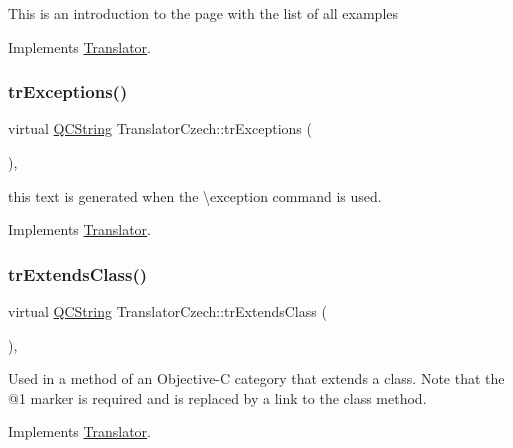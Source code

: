 This is an introduction to the page with the list of all examples 

Implements \mbox{\hyperlink{class_translator}{Translator}}.

\mbox{\label{class_translator_czech_af1f3a72b737a602f598d5bf13b7fa20d}} 
\subsubsection{\texorpdfstring{trExceptions()}{trExceptions()}}
{\footnotesize\ttfamily virtual \mbox{\hyperlink{class_q_c_string}{Q\+C\+String}} Translator\+Czech\+::tr\+Exceptions (\begin{DoxyParamCaption}{ }\end{DoxyParamCaption})\hspace{0.3cm}{\ttfamily [inline]}, {\ttfamily [virtual]}}

this text is generated when the \textbackslash{}exception command is used. 

Implements \mbox{\hyperlink{class_translator}{Translator}}.

\mbox{\label{class_translator_czech_ad43714f03c8afe7e3095394a9e0be8e4}} 
\subsubsection{\texorpdfstring{trExtendsClass()}{trExtendsClass()}}
{\footnotesize\ttfamily virtual \mbox{\hyperlink{class_q_c_string}{Q\+C\+String}} Translator\+Czech\+::tr\+Extends\+Class (\begin{DoxyParamCaption}{ }\end{DoxyParamCaption})\hspace{0.3cm}{\ttfamily [inline]}, {\ttfamily [virtual]}}

Used in a method of an Objective-\/C category that extends a class. Note that the @1 marker is required and is replaced by a link to the class method. 

Implements \mbox{\hyperlink{class_translator}{Translator}}.

\mbox{\label{class_translator_czech_aff3e4fe98dc7e439cc8367c0ac1e1dca}} 

